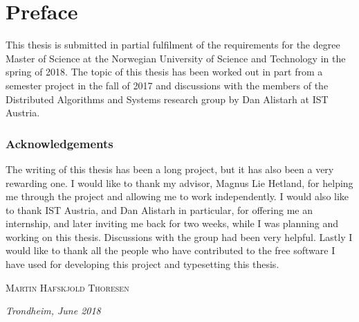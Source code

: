 \par\break\null%
\vsize%
\section*{Preface}

This thesis is submitted in partial fulfilment of the requirements for the degree Master of Science
at the Norwegian University of Science and Technology in the spring of 2018. The topic of this
thesis has been worked out in part from a semester project in the fall of 2017 and discussions with
the members of the Distributed Algorithms and Systems research group by Dan Alistarh at IST Austria.


\subsubsection*{Acknowledgements}

The writing of this thesis has been a long project, but it has also been a very rewarding one.  I
would like to thank my advisor, Magnus Lie Hetland, for helping me through the project and
allowing me to work independently. I would also like to thank IST Austria, and Dan Alistarh in
particular, for offering me an internship, and later inviting me back for two weeks, while I was
planning and working on this thesis. Discussions with the group had been very helpful.
Lastly I would like to thank all the people who have contributed to the free software I have used
for developing this project and typesetting this thesis.

\vfill
\hfill \textsc{Martin Hafskjold Thoresen}

\hfill \textit{Trondheim, June 2018}
\vfill
